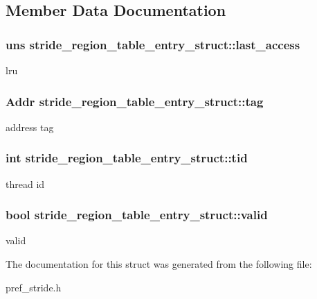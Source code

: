 \subsection{Member Data Documentation}
\hypertarget{structstride__region__table__entry__struct_a0118b9ae31d02a2eda63579019c3169e}{
\subsubsection[{last\_\-access}]{\setlength{\rightskip}{0pt plus 5cm}uns {\bf stride\_\-region\_\-table\_\-entry\_\-struct::last\_\-access}}}
\label{structstride__region__table__entry__struct_a0118b9ae31d02a2eda63579019c3169e}
lru \hypertarget{structstride__region__table__entry__struct_a5b2f4c2295e9943679e4b90d3763953c}{
\subsubsection[{tag}]{\setlength{\rightskip}{0pt plus 5cm}Addr {\bf stride\_\-region\_\-table\_\-entry\_\-struct::tag}}}
\label{structstride__region__table__entry__struct_a5b2f4c2295e9943679e4b90d3763953c}
address tag \hypertarget{structstride__region__table__entry__struct_a122e1ad69539f007576f15f7c313c7c0}{
\subsubsection[{tid}]{\setlength{\rightskip}{0pt plus 5cm}int {\bf stride\_\-region\_\-table\_\-entry\_\-struct::tid}}}
\label{structstride__region__table__entry__struct_a122e1ad69539f007576f15f7c313c7c0}
thread id \hypertarget{structstride__region__table__entry__struct_a1fc1f07a14c8d308bf7bb7a7b36b60aa}{
\subsubsection[{valid}]{\setlength{\rightskip}{0pt plus 5cm}bool {\bf stride\_\-region\_\-table\_\-entry\_\-struct::valid}}}
\label{structstride__region__table__entry__struct_a1fc1f07a14c8d308bf7bb7a7b36b60aa}
valid 

The documentation for this struct was generated from the following file:\begin{DoxyCompactItemize}
\item 
pref\_\-stride.h\end{DoxyCompactItemize}
